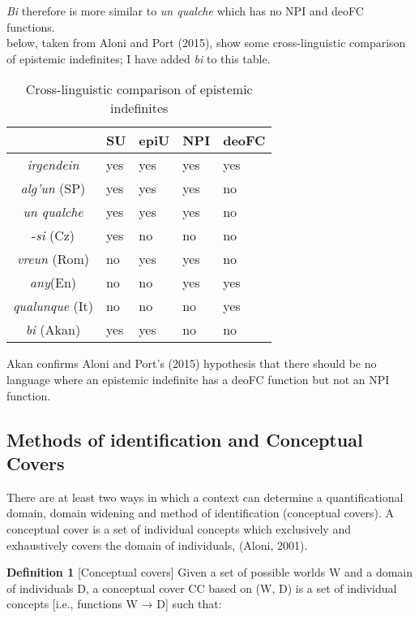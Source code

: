 \documentclass[output=paper,modfonts]{langsci/langscibook}
\begin{document}
\emph{Bi} therefore is more similar to \emph{un qualche} which has no NPI and deoFC functions. \\
  below, taken from Aloni and Port (2015), show some cross-linguistic comparison of epistemic indefinites; I have added \emph{bi} to this table.\\

\begin{table}
\caption{Cross-linguistic comparison of epistemic indefinites}
	\begin{tabular}{|c | p{2cm} | p{2cm} | p{2cm}| p{2cm}| }
		\hline
		{}		& SU		& 	epiU & NPI & deoFC \\ \hline
		\emph{irgendein} 			& yes 		& 	yes	& 	yes	& 	yes	\\ \hline
		\emph{alg'un} (SP)        & yes 	 	& 	yes 	& 	yes & 	no		\\ \hline
		 \emph{un qualche} 		& yes 	 	& 	yes 	& 	yes & 	no \\		\hline
		-\emph{si} (Cz)	& 	yes	& 	no &	 no & no			\\ \hline
		\emph{vreun} (Rom) 		& no	 	& 	yes 	& 	yes & 	no \\		\hline	
		\emph{any}(En) 		& no 	 	& 	no 	& 	yes & 	yes \\		\hline	
		\emph{qualunque} (It)		& no	 	& 	no 	& 	no & 	yes \\		\hline
		\emph{bi} (Akan) 		& yes 	 	& 	yes 	& 	no & 	no \\		\hline
	\end{tabular}
	\label{tab:owusu:1}
    \end{table}
    
Akan confirms Aloni and Port's (2015) hypothesis that there should be no language where an epistemic indefinite has a deoFC function but not an NPI function. 

\subsection{Methods of identification and Conceptual Covers}
There are at least two ways in which a context can determine a quantificational domain, domain widening and method of identification (conceptual covers). 
A conceptual cover is a set of individual concepts which exclusively and exhaustively covers the domain of individuals, (Aloni, 2001).

\textbf{Definition 1} [Conceptual covers] Given a set of possible worlds W and a domain of individuals D, a conceptual cover CC based on (W, D) is a set of individual concepts [i.e., functions W → D] such that:\\
\end{document}
